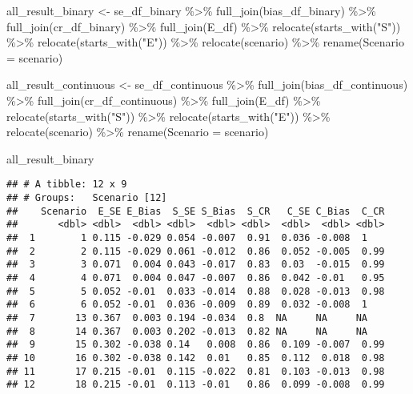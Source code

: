 \documentclass[
]{article}
\newenvironment{Shaded}{\begin{snugshade}}{\end{snugshade}}
\newcommand{\AttributeTok}[1]{\textcolor[rgb]{0.77,0.63,0.00}{#1}}
\newcommand{\FunctionTok}[1]{\textcolor[rgb]{0.00,0.00,0.00}{#1}}
\newcommand{\NormalTok}[1]{#1}
\newcommand{\OtherTok}[1]{\textcolor[rgb]{0.56,0.35,0.01}{#1}}
\newcommand{\SpecialCharTok}[1]{\textcolor[rgb]{0.00,0.00,0.00}{#1}}
\newcommand{\StringTok}[1]{\textcolor[rgb]{0.31,0.60,0.02}{#1}}
\begin{document}
\begin{Shaded}
\begin{Highlighting}[]
\NormalTok{all\_result\_binary }\OtherTok{\textless{}{-}}
\NormalTok{  se\_df\_binary }\SpecialCharTok{\%\textgreater{}\%} 
  \FunctionTok{full\_join}\NormalTok{(bias\_df\_binary) }\SpecialCharTok{\%\textgreater{}\%} 
  \FunctionTok{full\_join}\NormalTok{(cr\_df\_binary) }\SpecialCharTok{\%\textgreater{}\%} 
  \FunctionTok{full\_join}\NormalTok{(E\_df) }\SpecialCharTok{\%\textgreater{}\%}
  \FunctionTok{relocate}\NormalTok{(}\FunctionTok{starts\_with}\NormalTok{(}\StringTok{"S"}\NormalTok{)) }\SpecialCharTok{\%\textgreater{}\%} 
  \FunctionTok{relocate}\NormalTok{(}\FunctionTok{starts\_with}\NormalTok{(}\StringTok{"E"}\NormalTok{)) }\SpecialCharTok{\%\textgreater{}\%}
  \FunctionTok{relocate}\NormalTok{(scenario) }\SpecialCharTok{\%\textgreater{}\%}
  \FunctionTok{rename}\NormalTok{(}\AttributeTok{Scenario =}\NormalTok{ scenario)}
 
\NormalTok{all\_result\_continuous }\OtherTok{\textless{}{-}}
\NormalTok{  se\_df\_continuous }\SpecialCharTok{\%\textgreater{}\%} 
  \FunctionTok{full\_join}\NormalTok{(bias\_df\_continuous) }\SpecialCharTok{\%\textgreater{}\%} 
  \FunctionTok{full\_join}\NormalTok{(cr\_df\_continuous) }\SpecialCharTok{\%\textgreater{}\%} 
  \FunctionTok{full\_join}\NormalTok{(E\_df) }\SpecialCharTok{\%\textgreater{}\%}
  \FunctionTok{relocate}\NormalTok{(}\FunctionTok{starts\_with}\NormalTok{(}\StringTok{"S"}\NormalTok{)) }\SpecialCharTok{\%\textgreater{}\%} 
  \FunctionTok{relocate}\NormalTok{(}\FunctionTok{starts\_with}\NormalTok{(}\StringTok{"E"}\NormalTok{)) }\SpecialCharTok{\%\textgreater{}\%}
  \FunctionTok{relocate}\NormalTok{(scenario) }\SpecialCharTok{\%\textgreater{}\%}
  \FunctionTok{rename}\NormalTok{(}\AttributeTok{Scenario =}\NormalTok{ scenario)}

\NormalTok{all\_result\_binary }
\end{Highlighting}
\end{Shaded}

\begin{verbatim}
## # A tibble: 12 x 9
## # Groups:   Scenario [12]
##    Scenario  E_SE E_Bias  S_SE S_Bias  S_CR   C_SE C_Bias  C_CR
##       <dbl> <dbl>  <dbl> <dbl>  <dbl> <dbl>  <dbl>  <dbl> <dbl>
##  1        1 0.115 -0.029 0.054 -0.007  0.91  0.036 -0.008  1   
##  2        2 0.115 -0.029 0.061 -0.012  0.86  0.052 -0.005  0.99
##  3        3 0.071  0.004 0.043 -0.017  0.83  0.03  -0.015  0.99
##  4        4 0.071  0.004 0.047 -0.007  0.86  0.042 -0.01   0.95
##  5        5 0.052 -0.01  0.033 -0.014  0.88  0.028 -0.013  0.98
##  6        6 0.052 -0.01  0.036 -0.009  0.89  0.032 -0.008  1   
##  7       13 0.367  0.003 0.194 -0.034  0.8  NA     NA     NA   
##  8       14 0.367  0.003 0.202 -0.013  0.82 NA     NA     NA   
##  9       15 0.302 -0.038 0.14   0.008  0.86  0.109 -0.007  0.99
## 10       16 0.302 -0.038 0.142  0.01   0.85  0.112  0.018  0.98
## 11       17 0.215 -0.01  0.115 -0.022  0.81  0.103 -0.013  0.98
## 12       18 0.215 -0.01  0.113 -0.01   0.86  0.099 -0.008  0.99
\end{verbatim}
\end{document}
